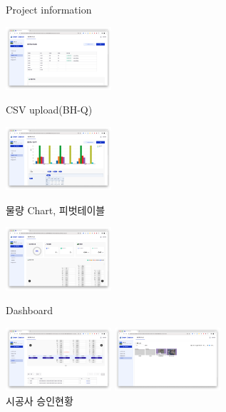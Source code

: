 \begin{itemize}
\begin{itemize}
\begin{itemize}[label=$\star$]
\begin{figure}[!ht]
\begin{fullwidth}
{					            \caption*{Project information}
				            }\qquad
				            \parbox{0.35\textwidth}{
					            \centering
					            \includegraphics[width=0.35\textwidth]{images/smart-checker-csv-upload.png}
					            \caption*{CSV upload(BH-Q)}
				            }
				            \parbox{0.35\textwidth}{
					            \centering
					            \includegraphics[width=0.35\textwidth]{images/smart-checker-csv-upload-pivot.png}
					            \caption*{물량 Chart, 피벗테이블}
				            }\qquad
				            \parbox{0.35\textwidth}{
					            \centering
					            \includegraphics[width=0.35\textwidth]{images/smart-checker-dashboard.png}
					            \caption*{Dashboard}
				            }\qquad
				            \parbox{0.35\textwidth}{
					            \centering
					            \includegraphics[width=0.35\textwidth]{images/smart-checker-approval-status.png}
					            \caption*{시공사 승인현황}
				            }\qquad
				            \parbox{0.35\textwidth}{
					            \centering
					            \includegraphics[width=0.35\textwidth]{images/smart-checker-file-browser.png}
}
\end{fullwidth}
\end{figure}
\end{itemize}
\end{itemize}
\end{itemize}
